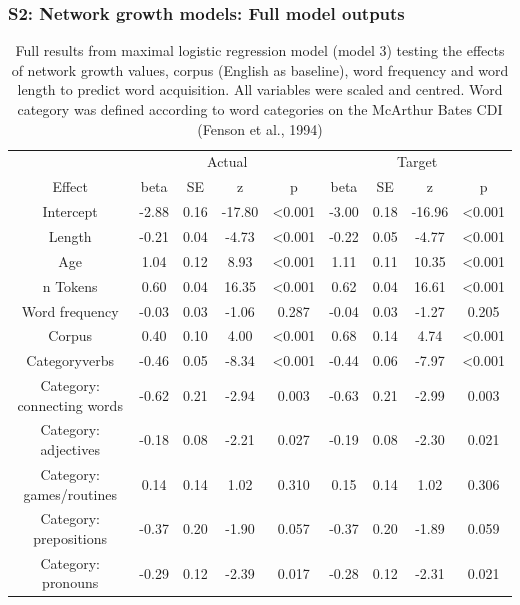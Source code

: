 \documentclass[
]{article}
\begin{document}
\hypertarget{s2-network-growth-models-full-model-outputs}{%
\subsubsection{S2: Network growth models: Full model
outputs}\label{s2-network-growth-models-full-model-outputs}}

\begin{longtable}[t]{ccccccccc}
\caption{\label{tab:full-data-summary}Full results from maximal logistic regression model (model 3) testing the effects of network growth values, corpus (English as baseline), word frequency and word length to predict word acquisition. All variables were scaled and centred. Word category was defined according to word categories on the McArthur Bates CDI (Fenson et al., 1994)}\\
\toprule
\multicolumn{1}{c}{ } & \multicolumn{4}{c}{Actual} & \multicolumn{4}{c}{Target} \\
\cmidrule(l{3pt}r{3pt}){2-5} \cmidrule(l{3pt}r{3pt}){6-9}
Effect & beta & SE & z & p & beta & SE & z & p\\
\midrule
Intercept & -2.88 & 0.16 & -17.80 & <0.001 & -3.00 & 0.18 & -16.96 & <0.001\\
Length & -0.21 & 0.04 & -4.73 & <0.001 & -0.22 & 0.05 & -4.77 & <0.001\\
Age & 1.04 & 0.12 & 8.93 & <0.001 & 1.11 & 0.11 & 10.35 & <0.001\\
n Tokens & 0.60 & 0.04 & 16.35 & <0.001 & 0.62 & 0.04 & 16.61 & <0.001\\
Word frequency & -0.03 & 0.03 & -1.06 & 0.287 & -0.04 & 0.03 & -1.27 & 0.205\\
\addlinespace
Corpus & 0.40 & 0.10 & 4.00 & <0.001 & 0.68 & 0.14 & 4.74 & <0.001\\
Categoryverbs & -0.46 & 0.05 & -8.34 & <0.001 & -0.44 & 0.06 & -7.97 & <0.001\\
Category: connecting words & -0.62 & 0.21 & -2.94 & 0.003 & -0.63 & 0.21 & -2.99 & 0.003\\
Category: adjectives & -0.18 & 0.08 & -2.21 & 0.027 & -0.19 & 0.08 & -2.30 & 0.021\\
Category: games/routines & 0.14 & 0.14 & 1.02 & 0.310 & 0.15 & 0.14 & 1.02 & 0.306\\
\addlinespace
Category: prepositions & -0.37 & 0.20 & -1.90 & 0.057 & -0.37 & 0.20 & -1.89 & 0.059\\
Category: pronouns & -0.29 & 0.12 & -2.39 & 0.017 & -0.28 & 0.12 & -2.31 & 0.021\\

\end{longtable}
\end{document}
